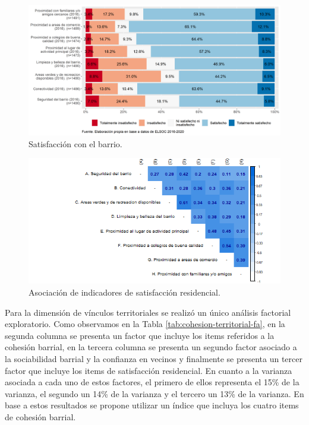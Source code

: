\documentclass[
  12pt,
]{book}
\begin{document}
\begin{figure}[H]

{\centering \includegraphics[width=1\linewidth,height=1\textheight]{output/graphs/satisfaccion-residencial} 

}

\caption{Satisfacción con el barrio.}\label{fig:satisfaccion-residencial}
\end{figure}

\begin{figure}[H]

{\centering \includegraphics[width=1\linewidth,height=1\textheight]{output/graphs/satisfaccion-residencial_cor} 

}

\caption{Asociación de indicadores de satisfacción residencial.}\label{fig:satisfaccion-residencial-cor}
\end{figure}

Para la dimensión de vínculos territoriales se realizó un único análisis factorial exploratorio. Como observamos en la Tabla \ref{tab:cohesion-territorial-fa}, en la segunda columna se presenta un factor que incluye los items referidos a la cohesión barrial, en la tercera columna se presenta un segundo factor asociado a la sociabilidad barrial y la confianza en vecinos y finalmente se presenta un tercer factor que incluye los items de satisfacción residencial. En cuanto a la varianza asociada a cada uno de estos factores, el primero de ellos representa el 15\% de la varianza, el segundo un 14\% de la varianza y el tercero un 13\% de la varianza. En base a estos resultados se propone utilizar un índice que incluya los cuatro items de cohesión barrial.
\end{document}
